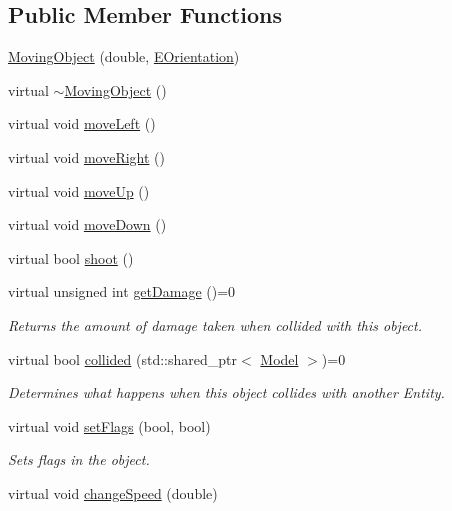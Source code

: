 \subsection*{\-Public \-Member \-Functions}
\begin{DoxyCompactItemize}
\item 
\hyperlink{classmodels_1_1MovingObject_a1c530e677ca2533d34905b14d7bbfbe4}{\-Moving\-Object} (double, \hyperlink{namespacemodels_adec64ede5178a8b8fed882b3790d423d}{\-E\-Orientation})
\item 
virtual \hyperlink{classmodels_1_1MovingObject_aaa787507c187de8ad0b7b6f36b185d97}{$\sim$\-Moving\-Object} ()
\item 
virtual void \hyperlink{classmodels_1_1MovingObject_a0e24c202d5627a1e8222ad36c2850fac}{move\-Left} ()
\item 
virtual void \hyperlink{classmodels_1_1MovingObject_a77842733e08b05c007ec25755dac2c17}{move\-Right} ()
\item 
virtual void \hyperlink{classmodels_1_1MovingObject_aec9555fba2a2efd000f99b3f29cb02eb}{move\-Up} ()
\item 
virtual void \hyperlink{classmodels_1_1MovingObject_a1f17c868da5ea06e0706a712e5a89512}{move\-Down} ()
\item 
virtual bool \hyperlink{classmodels_1_1MovingObject_a452872617ed6b1a334bfed4efcd5d3a0}{shoot} ()
\item 
virtual unsigned int \hyperlink{classmodels_1_1MovingObject_acd4fa7beb87308c2b3c7c08caa486d2b}{get\-Damage} ()=0
\begin{DoxyCompactList}\small\item\em \-Returns the amount of damage taken when collided with this object. \end{DoxyCompactList}\item 
virtual bool \hyperlink{classmodels_1_1MovingObject_ad2a0d1c543cfabaee82eea455c185d6a}{collided} (std\-::shared\-\_\-ptr$<$ \hyperlink{classmodels_1_1Model}{\-Model} $>$)=0
\begin{DoxyCompactList}\small\item\em \-Determines what happens when this object collides with another \-Entity. \end{DoxyCompactList}\item 
virtual void \hyperlink{classmodels_1_1MovingObject_a626081fda45cd2b9aca3561c07e87d14}{set\-Flags} (bool, bool)
\begin{DoxyCompactList}\small\item\em \-Sets flags in the object. \end{DoxyCompactList}\item 
virtual void \hyperlink{classmodels_1_1MovingObject_a4d77c816ebf7c519a3c1452abd68e3cf}{change\-Speed} (double)
\end{DoxyCompactItemize}
